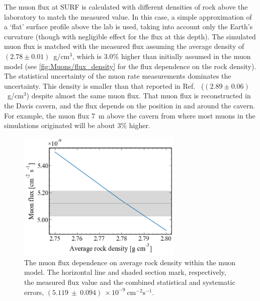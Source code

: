 The muon flux at SURF is calculated with different densities of rock above the laboratory to match the measured value. In this case, a simple approximation of a `flat' surface profile above the lab is used, taking into account only the Earth's curvature (though with negligible effect for the flux at this depth). The simulated muon flux is matched with the measured flux assuming the average density of $(2.78 \pm 0.01)$~g/cm$^3$, which is 3.0\% higher than initially assumed in the muon model (see \autoref{fig:Muons/flux_density} for the flux dependence on the rock density). The statistical uncertainty of the muon rate measurements dominates the uncertainty. This density is smaller than that reported in Ref.~\cite{majorana} ($(2.89 \pm 0.06)$~g/cm$^3$) despite almost the same muon flux. 
That muon flux is reconstructed in the Davis cavern, and the flux depends on the position in and around the cavern. For example, the muon flux 7~m above the cavern from where most muons in the simulations originated will be about 3\% higher. 

\begin{figure}[h!]
    \centering
    \includegraphics[width=0.7\textwidth]{figures/Muons/Flux_density_ws22_ws24.pdf}
    \caption[The muon flux dependence on average rock density within the muon model.]{The muon flux dependence on average rock density within the muon model. The horizontal line and shaded section mark, respectively, the measured flux value and the combined statistical and systematic errors, $(5.119~\pm~0.094)~\times10^{-9}~\textrm{cm}^{-2}\textrm{s}^{-1}$.}
    \label{fig:Muons/flux_density}
\end{figure}

